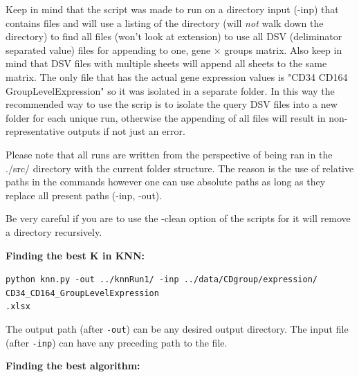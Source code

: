 \documentclass[12pt, a4paper]{article}
\begin{document}
\begin{multicols}{2}
                    Keep in mind that the script was made to run on a directory input (-inp) that contains files and will use a listing of the directory (will \textit{not} walk down the directory) to find all files (won't look at extension) to use all DSV (deliminator separated value) files for appending to one, gene $\times$ groups matrix. Also keep in mind that DSV files with multiple sheets will append all sheets to the same matrix. The only file that has the actual gene expression values is "CD34 CD164 GroupLevelExpression" so it was isolated in a separate folder. In this way the recommended way to use the scrip is to isolate the query DSV files into a new folder for each unique run, otherwise the appending of all files will result in non-representative outputs if not just an error.
                    \newline

                    Please note that all runs are written from the perspective of being ran in the ./src/ directory with the current folder structure. The reason is the use of relative paths in the commands however one can use absolute paths as long as they replace all present paths (-inp, -out).
                    \newline

                    Be very careful if you are to use the -clean option of the scripts for it will remove a directory recursively.
                    \newline

                    \textbf{Finding the best K in KNN:}
                    \newline

                    \begin{minipage}{\linewidth}
                    \texttt{python knn.py -out ../knnRun1/ -inp ../data/CDgroup/expression/ \\ CD34\_CD164\_GroupLevelExpression \\ .xlsx}
                    \end{minipage}
                    \newline

                    The output path (after \texttt{-out}) can be any desired output directory.  
                    The input file (after \texttt{-inp}) can have any preceding path to the file.
                    \newline

                    \textbf{Finding the best algorithm:}
                    \newline


\end{multicols}
\end{document}
